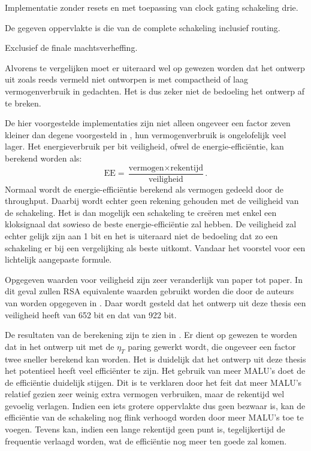 \begin{table}[h]
	\footnotesize \footnotemark[2] Implementatie zonder resets en met toepassing van clock gating schakeling drie.
	
	\footnotemark[3] De gegeven oppervlakte is die van de complete schakeling inclusief routing.
	
	\footnotemark[4] Exclusief de finale machtsverheffing.
	
\end{table}

Alvorens te vergelijken moet er uiteraard wel op gewezen worden dat het ontwerp uit \cite{beuchat-asic} zoals reeds vermeld niet ontworpen is met compactheid of laag vermogenverbruik in gedachten. Het is dus zeker niet de bedoeling het ontwerp af te breken. 

De hier voorgestelde implementaties zijn niet alleen ongeveer een factor zeven kleiner dan degene voorgesteld in \cite{beuchat-asic}, hun vermogenverbruik is ongelofelijk veel lager. Het energieverbruik per bit veiligheid, ofwel de energie-effici\"entie, kan berekend worden als:
\[\text{EE} = \frac{\text{vermogen} \times \text{rekentijd}}{\text{veiligheid}}.\]
Normaal wordt de energie-effici\"entie berekend als vermogen gedeeld door de throughput. Daarbij wordt echter geen rekening gehouden met de veiligheid van de schakeling. Het is dan mogelijk een schakeling te cre\"eren met enkel een kloksignaal dat sowieso de beste energie-effici\"entie zal hebben. De veiligheid zal echter gelijk zijn aan 1 bit en het is uiteraard niet de bedoeling dat zo een schakeling er bij een vergelijking als beste uitkomt. Vandaar het voorstel voor een lichtelijk aangepaste formule.

Opgegeven waarden voor veiligheid zijn zeer veranderlijk van paper tot paper. In dit geval zullen RSA equivalente waarden gebruikt worden die door de auteurs van \cite{beuchat-asic} worden opgegeven in \cite{beuchat}. Daar wordt gesteld dat het ontwerp uit deze thesis een veiligheid heeft van 652 bit en dat van \cite{beuchat-asic} 922 bit.

De resultaten van de berekening zijn te zien in . Er dient op gewezen te worden dat in het ontwerp uit \cite{beuchat-asic} met de $\eta_T$ paring gewerkt wordt, die ongeveer een factor twee sneller berekend kan worden. Het is duidelijk dat het ontwerp uit deze thesis het potentieel heeft veel effici\"enter te zijn. Het gebruik van meer MALU's doet de de effici\"entie duidelijk stijgen. Dit is te verklaren door het feit dat meer MALU's relatief gezien zeer weinig extra vermogen verbruiken, maar de rekentijd wel gevoelig verlagen. Indien een iets grotere oppervlakte dus geen bezwaar is, kan de effici\"entie van de schakeling nog flink verhoogd worden door meer MALU's toe te voegen. Tevens kan, indien een lange rekentijd geen punt is, tegelijkertijd de frequentie verlaagd worden, wat de effici\"entie nog meer ten goede zal komen. 

